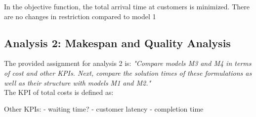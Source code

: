 In the objective function, the total arrival time at customers is minimized. There are no changes in restriction compared to model 1


\vspace{0.5cm}
\subsection{Analysis 2: Makespan and Quality Analysis}
The provided assignment for analysis 2 is: \textit{"Compare models M3 and M4 in terms of cost and other KPIs. Next, compare the solution times of these formulations as well as their structure with models M1 and M2."} \\

The KPI of total costs is defined as:

Other KPIs:
- waiting time?
- customer latency
- completion time

\newpage


